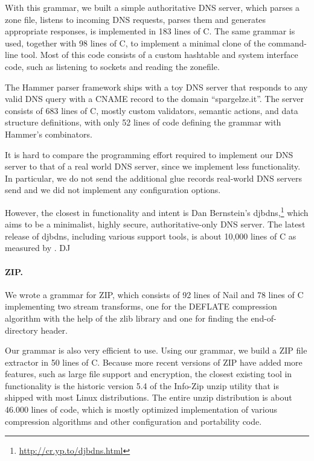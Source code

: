   
With this grammar, we built a simple authoritative DNS server, which parses a zone file, listens to incoming DNS
requests, parses them and generates appropriate responses, is implemented in 183 lines of C. The
same grammar is used, together with 98 lines of C, to implement a minimal clone of the
 command-line tool. Most of this code consists of a custom hashtable and system
interface code, such as listening to sockets and reading the zonefile. 

The Hammer parser framework\cite{hammer-parser} ships with a toy DNS server that responds to
any valid DNS query with a CNAME record to the domain ``spargelze.it''. 
The server consists of 683 lines of C, mostly custom validators, semantic actions,
and data structure definitions, with only 52 lines of code defining the
grammar with Hammer's combinators.

It is hard to compare the programming effort required to implement
our DNS server to that of a real world DNS server, since we implement less functionality.
 In particular, we do not send the additional glue records real-world DNS servers send and
we did not implement any configuration options.

However, the closest in functionality and intent is Dan Bernstein's
djbdns,\footnote{\url{http://cr.yp.to/djbdns.html}} which aims to be a minimalist, highly secure,
authoritative-only DNS server. The latest release of djbdns, including various support tools, is
about 10,000 lines of C as measured by . DJ

\paragraph{ZIP.}


We wrote a grammar for ZIP, which consists of 92 lines of Nail and 78 lines of C implementing two
stream transforms, one for the DEFLATE compression algorithm with the help of the zlib library and
one for finding the end-of-directory header. 

Our grammar is also very efficient to use. Using our grammar, we build a ZIP file extractor in 50
lines of C. Because more recent versions of ZIP have added more features, such as large file support
and encryption, the closest existing tool in functionality is the historic version 5.4 of the Info-Zip unzip
utility\cite{infozip} that is shipped with most Linux distributions. The entire unzip distribution
is about 46.000 lines of code, which is mostly optimized implementation of various compression
algorithms and other configuration and portability code.

